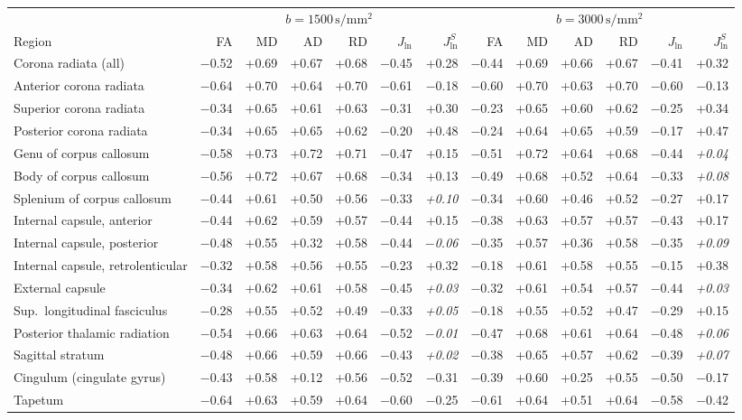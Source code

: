 \begin{tabular}{@{}lrrrrrrrrrrrr@{}}
\toprule
 & \multicolumn{6}{c}{$b=1500\,\mathrm{s/mm^2}$} & \multicolumn{6}{c}{$b=3000\,\mathrm{s/mm^2}$}\\
\cmidrule(lr){2-7}\cmidrule(l){8-13}
Region & FA & MD & AD & RD & $J_{\ln}$ & $J_{\ln}^{S}$ & FA & MD & AD & RD & $J_{\ln}$ & $J_{\ln}^{S}$\\
\midrule
Corona radiata (all) & $-$0.52 & +0.69 & +0.67 & +0.68 & $-$0.45 & +0.28 & $-$0.44 & +0.69 & +0.66 & +0.67 & $-$0.41 & +0.32\\
Anterior corona radiata & $-$0.64 & +0.70 & +0.64 & +0.70 & $-$0.61 & $-$0.18 & $-$0.60 & +0.70 & +0.63 & +0.70 & $-$0.60 & $-$0.13\\
Superior corona radiata & $-$0.34 & +0.65 & +0.61 & +0.63 & $-$0.31 & +0.30 & $-$0.23 & +0.65 & +0.60 & +0.62 & $-$0.25 & +0.34\\
Posterior corona radiata & $-$0.34 & +0.65 & +0.65 & +0.62 & $-$0.20 & +0.48 & $-$0.24 & +0.64 & +0.65 & +0.59 & $-$0.17 & +0.47\\
Genu of corpus callosum & $-$0.58 & +0.73 & +0.72 & +0.71 & $-$0.47 & +0.15 & $-$0.51 & +0.72 & +0.64 & +0.68 & $-$0.44 & \textit{+0.04}\\
Body of corpus callosum & $-$0.56 & +0.72 & +0.67 & +0.68 & $-$0.34 & +0.13 & $-$0.49 & +0.68 & +0.52 & +0.64 & $-$0.33 & \textit{+0.08}\\
Splenium of corpus callosum & $-$0.44 & +0.61 & +0.50 & +0.56 & $-$0.33 & \textit{+0.10} & $-$0.34 & +0.60 & +0.46 & +0.52 & $-$0.27 & +0.17\\
Internal capsule, anterior & $-$0.44 & +0.62 & +0.59 & +0.57 & $-$0.44 & +0.15 & $-$0.38 & +0.63 & +0.57 & +0.57 & $-$0.43 & +0.17\\
Internal capsule, posterior & $-$0.48 & +0.55 & +0.32 & +0.58 & $-$0.44 & \textit{$-$0.06} & $-$0.35 & +0.57 & +0.36 & +0.58 & $-$0.35 & \textit{+0.09}\\
Internal capsule, retrolenticular & $-$0.32 & +0.58 & +0.56 & +0.55 & $-$0.23 & +0.32 & $-$0.18 & +0.61 & +0.58 & +0.55 & $-$0.15 & +0.38\\
External capsule & $-$0.34 & +0.62 & +0.61 & +0.58 & $-$0.45 & \textit{+0.03} & $-$0.32 & +0.61 & +0.54 & +0.57 & $-$0.44 & \textit{+0.03}\\
Sup.\ longitudinal fasciculus & $-$0.28 & +0.55 & +0.52 & +0.49 & $-$0.33 & \textit{+0.05} & $-$0.18 & +0.55 & +0.52 & +0.47 & $-$0.29 & +0.15\\
Posterior thalamic radiation & $-$0.54 & +0.66 & +0.63 & +0.64 & $-$0.52 & \textit{$-$0.01} & $-$0.47 & +0.68 & +0.61 & +0.64 & $-$0.48 & \textit{+0.06}\\
Sagittal stratum & $-$0.48 & +0.66 & +0.59 & +0.66 & $-$0.43 & \textit{+0.02} & $-$0.38 & +0.65 & +0.57 & +0.62 & $-$0.39 & \textit{+0.07}\\
Cingulum (cingulate gyrus) & $-$0.43 & +0.58 & +0.12 & +0.56 & $-$0.52 & $-$0.31 & $-$0.39 & +0.60 & +0.25 & +0.55 & $-$0.50 & $-$0.17\\
Tapetum & $-$0.64 & +0.63 & +0.59 & +0.64 & $-$0.60 & $-$0.25 & $-$0.61 & +0.64 & +0.51 & +0.64 & $-$0.58 & $-$0.42\\
\bottomrule
\end{tabular}